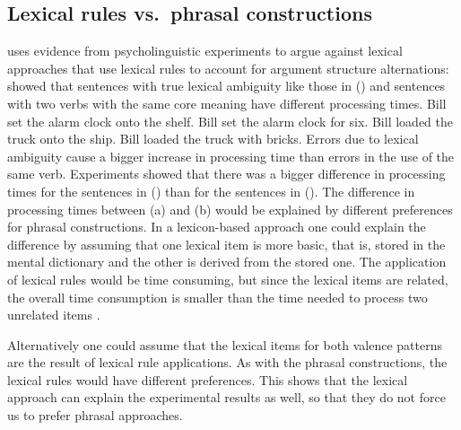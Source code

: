 \begin{exe}
\begin{xlist}[iv.]
\begin{exe}
\begin{xlist}[iv.]
\subsection{Lexical rules vs.\ phrasal constructions}
\label{sec-lr-phrasal-psycho}

\mbox{}\citet[Section~1.4.5]{Goldberg95a} uses evidence from psycholinguistic experiments to argue against lexical
approaches that use lexical rules to account for argument structure alternations: \citet{CT88a}
showed that sentences with true lexical ambiguity like those in () and sentences with two
verbs with the same core meaning have different processing times.
\eal
\ex Bill set the alarm clock onto the shelf.
\ex Bill set the alarm clock for six.
\zl
\eal
\ex Bill loaded the truck onto the ship.
\ex Bill loaded the truck with bricks.
\zl
Errors due to lexical ambiguity cause a bigger increase in processing time than errors in the use of
the same verb. Experiments showed that there was a bigger difference in processing times for the
sentences in () than for the sentences in (). The difference in processing times
between (a) and (b) would be explained by different preferences for phrasal
constructions. In a lexicon-based approach one could explain the difference by assuming that one
lexical item is more basic, that is, stored in the mental dictionary and the other is derived from
the stored one. The application of lexical rules would be time consuming, but since the lexical
items are related, the overall time consumption is smaller than the time needed to process
two unrelated items \citep[]{Mueller2002b}.

Alternatively one could assume that the lexical items for both valence patterns are the result of
lexical rule applications. As with the phrasal constructions, the lexical rules would have different
preferences. This shows that the lexical approach can explain the experimental results as well, so
that they do not force us to prefer phrasal approaches.


\end{xlist}
\end{exe}
\end{xlist}
\end{exe}
